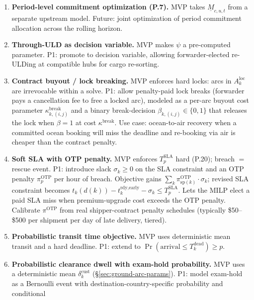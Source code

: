 \documentclass[11pt,a4paper]{article}
\theoremstyle{definition}
\begin{document}
\begin{enumerate}
  \item \textbf{Period-level commitment optimization (P.7).} MVP takes $\underline{M}_{c,u,t}$
        from a separate upstream model. Future: joint optimization of period commitment
        allocation across the rolling horizon.
  \item \label{item:psi-decision-var} \textbf{Through-ULD as decision variable.} MVP makes $\psi$ a pre-computed
        parameter. P1: promote to decision variable, allowing forwarder-elected re-ULDing
        at compatible hubs for cargo re-sorting.
  \item \label{item:lock-buyout} \textbf{Contract buyout / lock breaking.} MVP enforces
        hard locks: arcs in $A_k^{\text{loc}}$ are irrevocable within a solve. P1: allow
        penalty-paid lock breaks (forwarder pays a cancellation fee to free a locked arc),
        modeled as a per-arc buyout cost parameter $\kappa_{k,(i,j)}^{\text{break}}$ and a
        binary break-decision $\beta_{k,(i,j)} \in \{0,1\}$ that releases the lock when
        $\beta = 1$ at cost $\kappa^{\text{break}}$. Use case: ocean-to-air recovery when a
        committed ocean booking will miss the deadline and re-booking via air is cheaper
        than the contract penalty.
  \item \label{item:sla-soft-otp} \textbf{Soft SLA with OTP penalty.} MVP enforces
        $T_p^{\text{SLA}}$ hard (P.20); breach $=$ rescue event. P1: introduce slack
        $\sigma_k \geq 0$ on the SLA constraint and an OTP penalty $\pi^{\text{OTP}}_p$
        per hour of breach. Objective gains $\sum_k \pi^{\text{OTP}}_{\text{sp}(k)} \cdot \sigma_k$;
        revised SLA constraint becomes $t_k(d(k)) - t_k^{\text{rdy,early}} - \sigma_k \leq T_p^{\text{SLA}}$.
        Lets the MILP elect a paid SLA miss when premium-upgrade cost exceeds the OTP
        penalty. Calibrate $\pi^{\text{OTP}}$ from real shipper-contract penalty schedules
        (typically \$50--\$500 per shipment per day of late delivery, tiered).
  \item \textbf{Probabilistic transit time objective.} MVP uses deterministic mean transit
        and a hard deadline. P1: extend to $\Pr(\text{arrival} \leq T_k^{\text{dead}}) \geq p$.
  \item \label{item:probabilistic-clearance} \textbf{Probabilistic clearance dwell with
        exam-hold probability.} MVP uses a deterministic mean
        $\delta^{\text{cust}}_k$ (\S\ref{sec:ground-arc-params}). P1: model exam-hold as a
        Bernoulli event with destination-country-specific probability and conditional

\end{enumerate}
\end{document}
